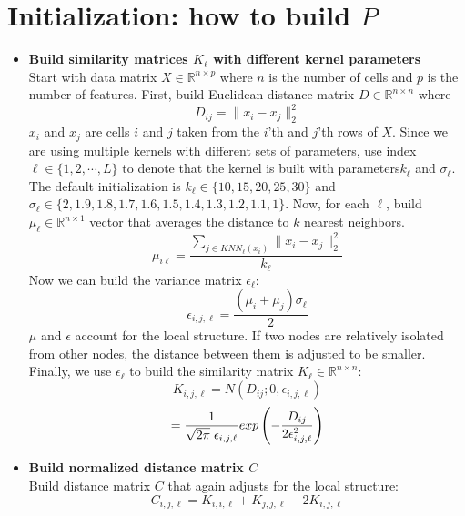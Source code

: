 \documentclass[11pt]{article}
\begin{document}
\section*{Initialization: how to build $P$}
\begin{itemize}
\item \textbf{Build similarity matrices $K_{\ell}$ with different kernel parameters}\\
Start with data matrix $X \in \mathbb{R}^{n \times p}$ where $n$ is the number of cells and $p$ is the number of features. First, build Euclidean distance matrix $D \in \mathbb{R}^{n \times n}$ where
$$D_{ij} = \|x_i - x_j\|_2^2$$
$x_i$ and $x_j$ are cells $i$ and $j$ taken from the $i$'th and $j$'th rows of $X$.  Since we are using multiple kernels with different sets of parameters, use index $\ell \in \{ 1, 2, \cdots , L\}$ to denote that the kernel is built with parameters$k_{\ell}$ and $\sigma_{\ell}$. The default initialization is $k_{\ell}\in \{10,15,20,25,30\}$ and $\sigma_{\ell} \in \{2,1.9,1.8,1.7,1.6,1.5,1.4,1.3,1.2,1.1,1\}$. Now, for each $\ell$, build $\mu_{\ell} \in \mathbb{R}^{n \times 1}$ vector that averages the distance to $k$ nearest neighbors.
$$\mu_{i\ell} = \frac{\sum_{j \in KNN_{\ell} (x_i)}\|x_i - x_j\|_2^2}{k_{\ell}}$$
Now we can build the variance matrix $\epsilon_{\ell}$:
$$\epsilon_{i,j,\ell} = \frac{(\mu_i + \mu_j)\sigma_{\ell}}{2}$$
$\mu$ and $\epsilon$ account for the local structure. If two nodes are relatively isolated from other nodes, the distance between them is adjusted to be smaller. Finally, we use $\epsilon_{\ell}$ to build the similarity matrix $K_{\ell} \in \mathbb{R}^{n \times n}$:
$$K_{i,j,\ell} = N(D_{ij}; 0, \epsilon_{i,j,\ell})$$
$$= \frac{1}{\sqrt{2\pi}\hspace{1mm} \epsilon_{i,j,\ell}} exp \left( 
-\frac{D_{ij}}{2\epsilon_{i,j,\ell}^2}
\right)$$

\item \textbf{Build normalized distance matrix $C$}\\
Build distance matrix $C$ that again adjusts for the local structure:
$$C_{i,j,\ell} = K_{i,i,\ell} + K_{j,j,\ell} - 2K_{i,j,\ell}$$


\end{itemize}
\end{document}
